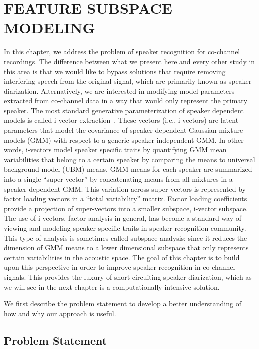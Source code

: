 
\chapter{FEATURE SUBSPACE MODELING}

In this chapter, we address the problem of speaker recognition for co-channel recordings. 
The difference between what we present here and every other study in this area is that we would like to bypass solutions that require removing interfering speech from the original signal, which are primarily known as speaker diarization. 
Alternatively, we are interested in modifying model parameters extracted from co-channel data in a way that would only represent the primary speaker. 
The most standard generative parameterization of speaker dependent models is called i-vector extraction~\cite{najeem_frontendanalysis}. 
These vectors (i.e., i-vectors) are latent parameters that model the covariance of speaker-dependent Gaussian mixture models (GMM) with respect to a generic speaker-independent GMM. 
In other words, i-vectors model speaker specific traits by quantifying GMM mean variabilities that belong to a certain speaker by comparing the means to universal background model (UBM) means. 
GMM means for each speaker are summarized into a single ``super-vector'' by concatenating means from all mixtures in a speaker-dependent GMM. 
This variation across super-vectors is represented by factor loading vectors in a ``total variability'' matrix. 
Factor loading coefficients provide a projection of super-vectors into a smaller subspace, i-vector subspace. 
The use of i-vectors, factor analysis in general, has become a standard way of viewing and modeling speaker specific traits in speaker recognition community. 
This type of analysis is sometimes called subspace analysis; since it reduces the dimension of GMM means to a lower dimensional subspace that only represents certain variabilities in the acoustic space. 
The goal of this chapter is to build upon this perspective in order to improve speaker recognition in co-channel signals. 
This provides the luxury of short-circuiting speaker diarization, which as we will see in the next chapter is a computationally intensive solution. 

We first describe the problem statement to develop a better understanding of how and why our approach is useful. 

\section{Problem Statement}

